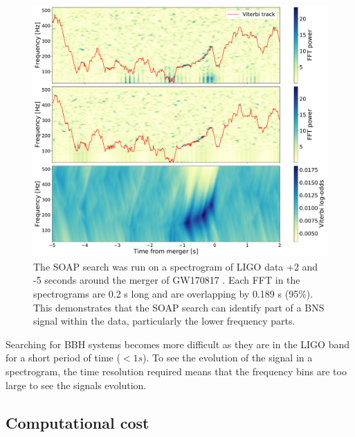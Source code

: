 \begin{figure}[h]
	\centering
	\includegraphics[width=\linewidth]{C3_soap/gw170817_vitplot.pdf}
	\caption[SOAP search run on GW170817]{The SOAP search was run on a spectrogram of \gls{LIGO} data +2 and -5 seconds around the merger of GW170817 \citep{abbott2017GW170817Observation}. Each \gls{FFT} in the spectrograms are 0.2 s long and are overlapping by  0.189 s (95\%). This demonstrates that the SOAP search can identify part of a \gls{BNS} signal within the data, particularly the lower frequency parts.}
	\label{soap:sens:other:gw170817}
\end{figure}

Searching for \gls{BBH} systems becomes more difficult as they are in the \gls{LIGO} band for a short period of time ($ < 1 s$).
To see the evolution of the signal in a spectrogram, the time resolution required means that the frequency bins are too large to see the signals evolution.



\subsection{\label{soap:results:time}Computational cost}

